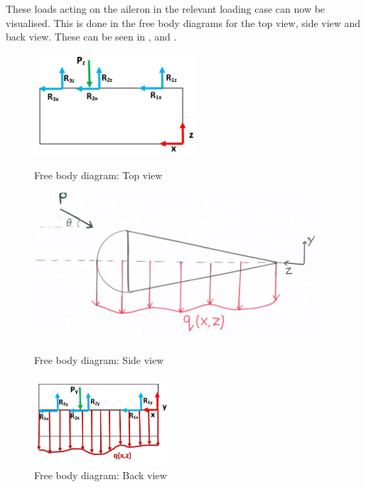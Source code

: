 \noindent These loads acting on the aileron in the relevant loading case can now be visualised. This is done in the free body diagrams for the top view, side view and back view. These can be seen in ,  and .
\par
\begin{figure}[H]
\begin{minipage}[b]{0.45\linewidth}
\centering
\includegraphics[width=6cm]{Images/New_FBD_top.JPG}
\caption{Free body diagram: Top view}
\label{fig:FBD_top_view}
\end{minipage}
\hspace{0.5cm}
\begin{minipage}[b]{0.45\linewidth}
\centering
\includegraphics[width=0.95\textwidth]{Images/FBD_side_view.jpg}
\caption{Free body diagram: Side view}
\label{fig:FBD_side_view}
\end{minipage}
\begin{minipage}[b]{\linewidth}
\centering
\includegraphics[width=5cm]{Images/New_FBD_back_view.JPG}
\caption{Free body diagram: Back view}
\label{fig:FBD_back_view}
\end{minipage}
\end{figure}
